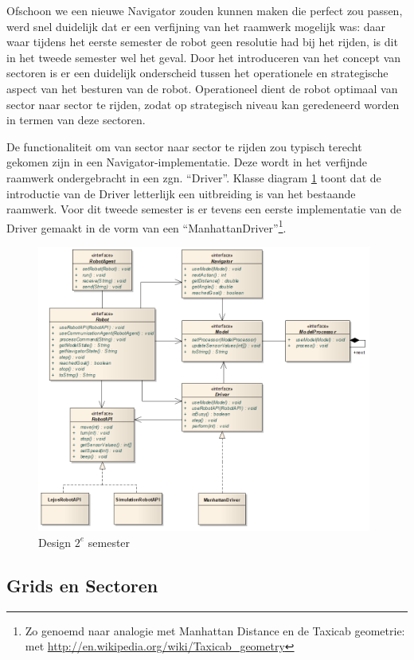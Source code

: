\documentclass[12pt,a4paper]{report}
\begin{document}
Ofschoon we een nieuwe Navigator zouden kunnen maken die perfect zou passen, werd snel duidelijk dat er een verfijning van het raamwerk mogelijk was: daar waar tijdens het eerste semester de robot geen resolutie had bij het rijden, is dit in het tweede semester wel het geval. Door het introduceren van het concept van sectoren is er een duidelijk onderscheid tussen het operationele en strategische aspect van het besturen van de robot. Operationeel dient de robot optimaal van sector naar sector te rijden, zodat op strategisch niveau kan geredeneerd worden in termen van deze sectoren.

De functionaliteit om van sector naar sector te rijden zou typisch terecht gekomen zijn in een Navigator-implementatie. Deze wordt in het verfijnde raamwerk ondergebracht in een zgn. ``Driver''. Klasse diagram \ref{uml:design-semster2} toont dat de introductie van de Driver letterlijk een uitbreiding is van het bestaande raamwerk. Voor dit tweede semester is er tevens een eerste implementatie van de Driver gemaakt in de vorm van een ``ManhattanDriver''\footnote{Zo genoemd naar analogie met Manhattan Distance en de Taxicab geometrie: met \url{http://en.wikipedia.org/wiki/Taxicab_geometry}}. 

\begin{figure}[htbp]
  \centering
  \includegraphics[width=110mm]{resources/design-semester2.png}
  \caption{Design $2^e$ semester}
  \label{uml:design-semster2}
\end{figure}

\subsection{Grids en Sectoren}
\end{document}
